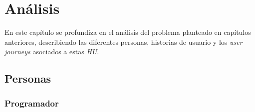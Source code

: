 \chapter{Análisis}

En este capítulo se profundiza en el análisis del problema planteado en capítulos anteriores, describiendo las diferentes personas, historias de usuario y los \textit{user journeys} asociados a estas \textit{HU}.

\section{Personas}

\subsection{Programador}
\label{sec:personaProgramador}

